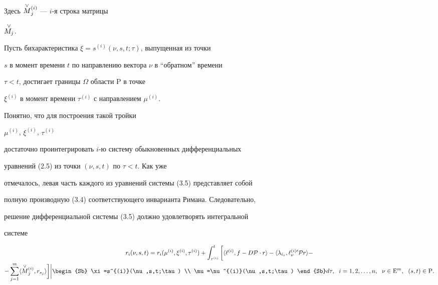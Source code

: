 Здесь $\overset{\vee}{M}{}_j^{(i)}$ --- $i$-я строка матрицы 


$\overset{\vee}{M_j}{}$.


Пусть бихарактеристика $\xi=s^{(i)}(\nu,s,t;\tau)$, выпущенная из точки


$s$ в момент времени $t$ по направлению вектора $\nu$ в ``обратном'' времени


$\tau<t$, достигает границы $\Omega$ области $\mathrm P$ в точке


$\xi^{(i)}$ в момент времени $\tau^{(i)}$ с направлением $\mu^{(i)}$.


Понятно, что для построения такой тройки


$\mu^{(i)}$, $\xi^{(i)}$, $\tau^{(i)}$


достаточно проинтегрировать $i$-ю систему обыкновенных дифференциальных


уравнений (2.5) из точки $(\nu,s,t)$ по $\tau<t$. Как уже 


отмечалось, левая часть каждого из уравнений системы (3.5) представляет собой 


полную производную (3.4) соответствующего инварианта Римана. Следовательно,


решение дифференциальной системы (3.5) должно удовлетворять интегральной 


системе


\begin{multline}


r_i(\nu,s,t)=r_i(\mu^{(i)}, \xi^{(i)}, \tau^{(i)})+


\int_{\tau^{(i)}}^{t} \bigg[ \la\ell^{(i)}, f - D{\cal P}\cdot r\ra -


\la\lambda_{i_s},\ell^{(i)\prime}_\nu {\cal P} r\ra - \\


%


- \sum_{j=1}^m \la \up{\vee}{M}_j^{(i)}, r_{s_j}\ra \bigg]


\bigg|\begin{Sb}


\xi=s^{(i)}(\nu,s,t;\tau) \\


\mu=\nu^{(i)}(\nu,s,t;\tau)


\end{Sb} 


d\tau,\ \; i=1,2,\dotsc,n,\ \; \nu \in {\mathrm E}^m, 


\ \; (s,t) \in {\mathrm P}.


\end{multline}


